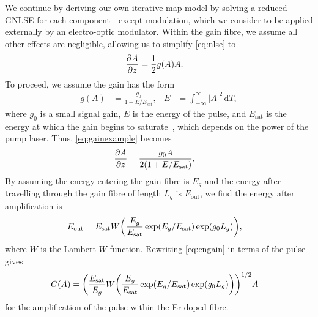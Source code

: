 \documentclass[9pt,twocolumn,twoside]{osajnl}
\let\originalleft\left
\let\originalright\right
\renewcommand{\left}{\mathopen{}\mathclose\bgroup\originalleft}
\renewcommand{\right}{\aftergroup\egroup\originalright}
\providecommand{\df}{\textrm{d}} %
\newcommand{\pdiff}[3][\hspace{-0.5pt}]{\frac{\partial^{#1}#2}{\partial{#3}^{#1}}} %
\newcommand{\Es}{E_{\textrm{sat}}} %
\begin{document}
We continue by deriving our own iterative map model by solving a reduced GNLSE for each component---except modulation, which we consider to be applied externally by an electro-optic modulator. Within the gain fibre, we assume all other effects are negligible, allowing us to simplify \eqref{eq:nlse} to
\begin{align}
	\pdiff{A}{z} &= \frac{1}{2}g(A)A.
	\label{eq:gainexample}
\end{align}
To proceed, we assume the gain has the form
\begin{align}
	g(A) &= \frac{g_0}{1 + E / \Es},& E &= \int_{-\infty}^\infty |A|^2 \, \df T,
	\label{eq:energy}
\end{align}
where $g_0$ is a small signal gain, $E$ is the energy of the pulse, and $\Es$ is the energy at which the gain begins to saturate~\cite{haus1984, shtyrina2017, silfvast2004}, which depends on the power of the pump laser. Thus, \eqref{eq:gainexample} becomes
\begin{align}
	\pdiff{A}{z} &= \frac{g_0 A}{2 \left( 1 + E / \Es \right)}.
\end{align}
By assuming the energy entering the gain fibre is $E_g$ and the energy after travelling through the gain fibre of length $L_g$ is $E_{\text{out}}$, we find the energy after amplification is
\begin{align}
	\label{eq:engain}
	E_{\text{out}} &= \Es W \left( \frac{E_g}{\Es} \exp( E_g / \Es ) \exp( g_0 L_g ) \right),
\end{align}
where $W$ is the Lambert $W$ function. Rewriting \eqref{eq:engain} in terms of the pulse gives
\begin{align}
	G(A) &= \left( \frac{\Es}{E_g} W \left( \frac{E_g}{\Es} \exp( E_g / \Es ) \exp( g_0 L_g ) \right) \right)^{1/2} A
	\label{eq:gainform}
\end{align}
for the amplification of the pulse within the Er-doped fibre.
\end{document}
